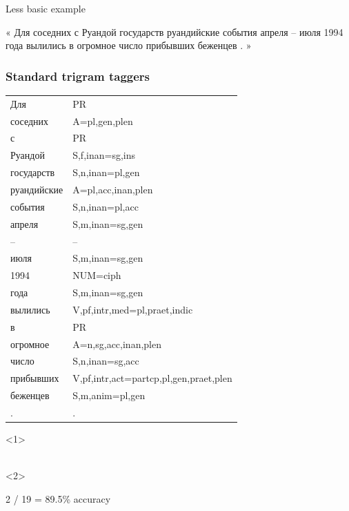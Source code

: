 \documentclass{beamer}
\begin{document}
\begin{frame}{Less basic example}

 \begin{large}
 « Для соседних с Руандой государств руандийские события апреля – июля 1994 года вылились в огромное число прибывших беженцев . »
 \end{large}

\end{frame}

\begin{frame}
  \frametitle{Standard trigram taggers}

    \begin{tiny}
        \begin{tabular}{ll}
        Для & PR  \\
        соседних & A=pl,gen,plen  \\
        с & PR  \\
        Руандой & S,f,inan=sg,ins  \\
        государств & S,n,inan=pl,gen  \\
        руандийские & \alert<2>{A=pl,acc,inan,plen}  \\
        события & \alert<2>{S,n,inan=pl,acc}  \\
        апреля & S,m,inan=sg,gen  \\
        – & –  \\
        июля & S,m,inan=sg,gen  \\
        1994 & NUM=ciph  \\
        года & S,m,inan=sg,gen  \\
        вылились & V,pf,intr,med=pl,praet,indic  \\
        в & PR  \\
        огромное & A=n,sg,acc,inan,plen  \\
        число & S,n,inan=sg,acc  \\
        прибывших & V,pf,intr,act=partcp,pl,gen,praet,plen  \\
        беженцев & S,m,anim=pl,gen  \\
        . & .  \\
        \end{tabular}
    \end{tiny}

    \begin{onlyenv}<1>
    ~\\
    ~\\
    \end{onlyenv}
    \begin{onlyenv}<2>
    ~\\
    \begin{flushright}
    2 / 19 = 89.5\% accuracy
    \end{flushright}
    \end{onlyenv}
    
\end{frame}
\end{document}

